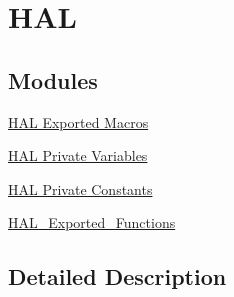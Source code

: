 \hypertarget{group___h_a_l}{}\section{H\+AL}
\label{group___h_a_l}
\subsection*{Modules}
\begin{DoxyCompactItemize}
\item 
\hyperlink{group___h_a_l___exported___macros}{H\+A\+L Exported Macros}
\item 
\hyperlink{group___h_a_l___private___variables}{H\+A\+L Private Variables}
\item 
\hyperlink{group___h_a_l___private___constants}{H\+A\+L Private Constants}
\item 
\hyperlink{group___h_a_l___exported___functions}{H\+A\+L\+\_\+\+Exported\+\_\+\+Functions}
\end{DoxyCompactItemize}


\subsection{Detailed Description}
